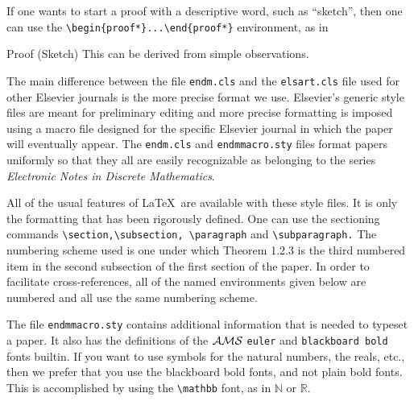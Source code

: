 \documentclass{endm}
\newcommand{\Nat}{{\mathbb N}}
\newcommand{\Real}{{\mathbb R}}
\begin{document}
If one wants to start a proof with a descriptive word, such as
``sketch'', then one can use the \verb+\begin{proof*}...\end{proof*}+
environment, as in

\begin{proof*}{Proof (Sketch)}
This can be derived from simple observations.
\end{proof*}

The main difference between the file \texttt{endm.cls} and the
\texttt{elsart.cls} file used for other Elsevier journals is the more
precise format we use. Elsevier's generic style files are meant for
preliminary editing and more precise formatting is imposed using a macro
file designed for the specific Elsevier journal in which the paper will
eventually appear. The \texttt{endm.cls} and \texttt{endmmacro.sty} files
format papers uniformly so that they all are easily recognizable as
belonging to the series \emph{Electronic Notes in Discrete Mathematics}.

All of the usual features of \LaTeX\ are available with these style files.
It is only the formatting that has been rigorously defined. One can use
the sectioning commands \verb+\section,\subsection, \paragraph+
and \verb+\subparagraph.+ The numbering scheme used is one under which
Theorem 1.2.3 is the third numbered item in the second subsection of the
first section of the paper. In order to facilitate cross-references, all
of the named environments given below are numbered and all use the same
numbering scheme.

The file \texttt{endmmacro.sty} contains additional information that is
needed to typeset a paper. It also has the definitions of the $\cal AMS$
\texttt{euler} and \texttt{blackboard bold} fonts builtin. If you want to
use symbols for the natural numbers, the reals, etc., then we prefer that
you use the blackboard bold fonts, and not plain bold fonts. This is
accomplished by using the \verb+\mathbb+ font, as in $\Nat$ or $\Real$.
\end{document}
